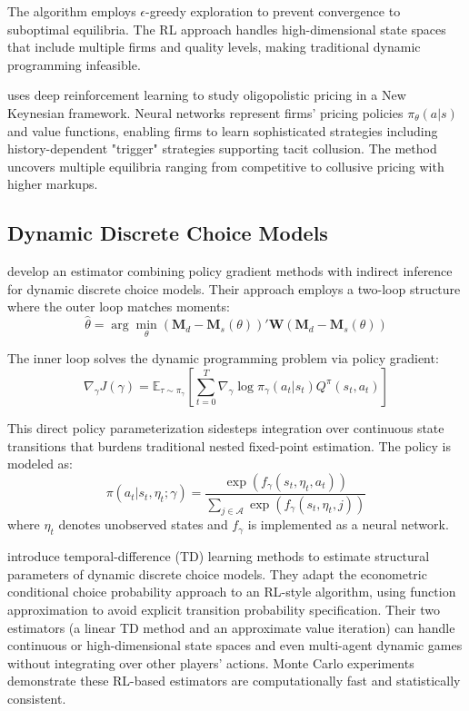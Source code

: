 The algorithm employs $\epsilon$-greedy exploration to prevent convergence to suboptimal equilibria. The RL approach handles high-dimensional state spaces that include multiple firms and quality levels, making traditional dynamic programming infeasible.

\citet{Covarrubias2022} uses deep reinforcement learning to study oligopolistic pricing in a New Keynesian framework. Neural networks represent firms' pricing policies $\pi_\theta(a|s)$ and value functions, enabling firms to learn sophisticated strategies including history-dependent "trigger" strategies supporting tacit collusion. The method uncovers multiple equilibria ranging from competitive to collusive pricing with higher markups.

\subsection{Dynamic Discrete Choice Models}

\citet{HuYang2025} develop an estimator combining policy gradient methods with indirect inference for dynamic discrete choice models. Their approach employs a two-loop structure where the outer loop matches moments:
\begin{equation}
\hat{\theta} = \arg \min_{\theta} \left( \mathbf{M}_d - \mathbf{M}_s(\theta) \right)' \mathbf{W} \left( \mathbf{M}_d - \mathbf{M}_s(\theta) \right)
\end{equation}

The inner loop solves the dynamic programming problem via policy gradient:
\begin{equation}
\nabla_\gamma J(\gamma) = \mathbb{E}_{\tau \sim \pi_\gamma} \left[ \sum_{t=0}^T \nabla_\gamma \log \pi_\gamma(a_t|s_t) Q^\pi(s_t, a_t) \right]
\end{equation}

This direct policy parameterization sidesteps integration over continuous state transitions that burdens traditional nested fixed-point estimation. The policy is modeled as:
\begin{equation}
\pi(a_t | s_t, \eta_t; \gamma) = \frac{\exp\left( f_\gamma(s_t, \eta_t, a_t) \right)}{\sum_{j \in \mathcal{A}} \exp\left( f_\gamma(s_t, \eta_t, j) \right)}
\end{equation}
where $\eta_t$ denotes unobserved states and $f_\gamma$ is implemented as a neural network.

\citet{AdusumilliEckardt2022} introduce temporal-difference (TD) learning methods to estimate structural parameters of dynamic discrete choice models. They adapt the econometric conditional choice probability approach to an RL-style algorithm, using function approximation to avoid explicit transition probability specification. Their two estimators (a linear TD method and an approximate value iteration) can handle continuous or high-dimensional state spaces and even multi-agent dynamic games without integrating over other players' actions. Monte Carlo experiments demonstrate these RL-based estimators are computationally fast and statistically consistent.

